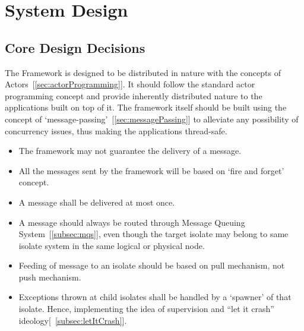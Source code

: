 \chapter{System Design}\label{chapter:general_design_decisions}

\section{Core Design Decisions}
The Framework is designed to be distributed in nature with the concepts of Actors~[\autoref{sec:actorProgramming}]. It should follow the standard actor programming concept and provide inherently distributed nature to the applications built on top of it. The framework itself should be built using the concept of ‘message-passing’~[\autoref{sec:messagePassing}] to alleviate any possibility of concurrency issues, thus making the applications thread-safe.

\begin{itemize}
  \item The framework may not guarantee the delivery of a message.
  \item All the messages sent by the framework will be based on ‘fire and forget’ concept.
  \item A message shall be delivered at most once.
  \item A message should always be routed through Message Queuing System~[\autoref{subsec:mqs}], even though the target isolate may belong to same isolate system in the same logical or physical node.
  \item Feeding of message to an isolate should be based on pull mechanism, not push mechanism.
  \item Exceptions thrown at child isolates shall be handled by a ‘spawner’ of that isolate. Hence, implementing the idea of supervision and “let it crash” ideology[~\autoref{subsec:letItCrash}].
\end{itemize}

